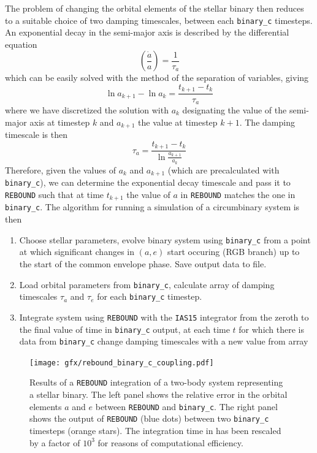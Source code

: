 \documentclass[ twoside,openright,titlepage,numbers=noenddot,headinclude,%
                footinclude=true,cleardoublepage=empty,abstractoff, %
                BCOR=5mm,paper=a4,fontsize=11pt,%
                american,%
                ]{scrreprt}
\begin{document}
The problem of changing the orbital elements of the stellar binary then reduces
to a suitable choice of two damping timescales, between each \texttt{binary\_c}
timesteps. An exponential decay in the semi-major axis is described by
the differential equation
\begin{equation}
    \left( \frac{\dot{a}}{a} \right)= \frac{1}{\tau_a} 
\end{equation}
which can be easily solved with the method of the separation of variables, giving
\begin{equation}
    \ln a_{k+1}-\ln a_k= \frac{t_{k+1}-t_k}{\tau_a} 
\end{equation}
where we have discretized the solution with $a_k$ designating the value of the
semi-major axis at timestep $k$ and $a_{k+1}$ the value at timestep $k+1$. The
damping timescale is then
\begin{equation}
    \tau_a = \frac{t_{k+1}-t_k}{\ln \frac{a_{k+1}}{a_k} } 
\end{equation}
Therefore, given the values of $a_k$ and $a_{k+1}$ (which are precalculated with
\texttt{binary\_c}), we can determine the exponential decay timescale and pass 
it to \texttt{REBOUND} such that at time $t_{k+1}$ the value of $a$ in 
\texttt{REBOUND} matches the one in \texttt{binary\_c}. The algorithm for
running a simulation of a circumbinary system is then
\begin{enumerate}
    \item Choose stellar parameters, evolve binary system using \texttt{binary\_c}
        from a point at which significant changes in $(a,e)$ start occuring (RGB 
        branch) up to the start of the common envelope phase. Save output data
        to file.
    \item Load orbital parameters from \texttt{binary\_c}, calculate array of
        damping timescales $\tau_a$ and $\tau_e$ for each \texttt{binary\_c}
        timestep.
    \item Integrate system using \texttt{REBOUND} with the \texttt{IAS15} integrator
        from the zeroth to the final value of time in \texttt{binary\_c} output, at
        each time $t$ for which there is data from \texttt{binary\_c} change 
        damping timescales with a new value from array
\end{enumerate}
\begin{figure}[!t]
\centering
\texttt{[image: gfx/rebound\_binary\_c\_coupling.pdf]}
    \caption{Results of a \texttt{REBOUND} integration of a two-body system representing
    a stellar binary. The left panel shows the relative error in the orbital elements
    $a$ and $e$ between \texttt{REBOUND} and \texttt{binary\_c}. The right panel
    shows the output of \texttt{REBOUND} (blue dots) between two \texttt{binary\_c}
    timesteps (orange stars). The integration time in  has been
    rescaled by a factor of $10^3$ for reasons of computational efficiency.}
\label{fig:reb_bin_coupling}
\end{figure}
\end{document}
